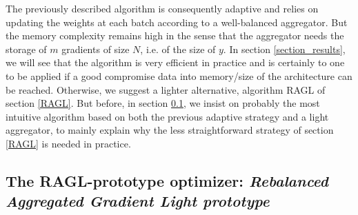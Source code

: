 The previously described algorithm is consequently adaptive and relies on updating the weights at each batch according to a well-balanced aggregator. 
But the memory complexity remains high in the sense that the aggregator needs the storage of $m$ gradients of size $N$, i.e. of the size of $y$. In section \ref{section_results},
we will see that the algorithm is very efficient in practice and is certainly 
to one to be applied if a good compromise data into memory/size of the architecture can be reached. Otherwise, we suggest a lighter alternative, algorithm RAGL of section
\ref{RAGL}. 
But before, in section \ref{RAGL_proto}, we insist on probably the most intuitive algorithm based on both the previous adaptive strategy and a light aggregator, to mainly 
explain why the less straightforward strategy of section \ref{RAGL} is needed in practice. 



\subsection{{The RAGL-prototype optimizer: {\it Rebalanced Aggregated Gradient Light prototype}}}
\label{RAGL_proto}


